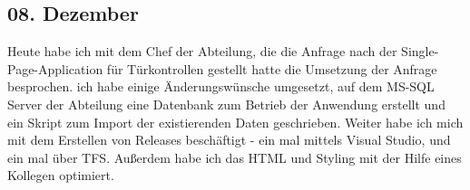 \subsection{08. Dezember}
Heute habe ich mit dem Chef der Abteilung, die die Anfrage nach der Single-Page-Application für Türkontrollen gestellt hatte die Umsetzung der Anfrage besprochen. ich habe einige Änderungswünsche umgesetzt, auf dem MS-SQL Server der Abteilung eine Datenbank zum Betrieb der Anwendung erstellt und ein Skript zum Import der existierenden Daten geschrieben. Weiter habe ich mich mit dem Erstellen von Releases beschäftigt - ein mal mittels Visual Studio, und ein mal über TFS. Außerdem habe ich das HTML und Styling mit der Hilfe eines Kollegen optimiert. 